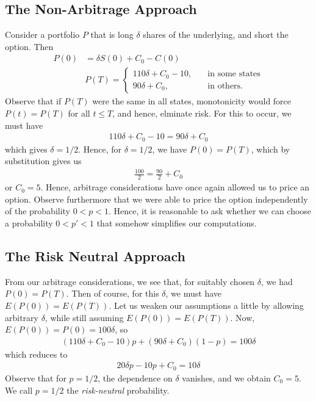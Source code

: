 \documentclass[12pt]{article}
\theoremstyle{plain}
\theoremstyle{definition}
\theoremstyle{remark}
\numberwithin{equation}{section}  %
\begin{document}
\subsection{The Non-Arbitrage Approach}
Consider a portfolio $P$
that is long $\delta$ shares of the underlying, and short the option.
Then
\begin{equation*}
	\begin{split}
		P(0) & = \delta S(0) + C_{0} - C(0)
		\\
		& P(T) = \begin{cases}
		110 \delta + C_{0} - 10, \quad & \text{in some states}
		\\
		90 \delta + C_{0}, \quad & \text{in others}.
	\end{cases}
\end{split}
	\end{equation*}
	Observe that if $P(T)$ were the same in all states, monotonicity would force
	$P(t) = P(T)$ for all $t \le T$, and hence, elminate risk. For this to occur,
	we must have
	\begin{equation*}
		\begin{split}
			110 \delta + C_{0} - 10 = 90 \delta + C_{0}
		\end{split}
	\end{equation*}
	which gives $\delta = 1/2$. Hence, for $\delta = 1/2$, we have
	$P(0) = P(T)$, which by substitution gives us
	\begin{equation*}
		\begin{split}
			\frac{100}{2} = \frac{90}{2} + C_{0}
		\end{split}
	\end{equation*}
	or $C_{0} = 5$. Hence, arbitrage considerations have once again
	allowed us to price an option. Observe furthermore that we were able
	to price the option independently of the probability $0 < p < 1$. 
	Hence, it is reasonable to ask whether we can choose a probability
	$0 < p' < 1$ that somehow simplifies our computations.
	\subsection{The Risk Neutral Approach}
	From our arbitrage considerations, we see that, for suitably chosen
	$\delta$, we had $P(0) = P(T)$. Then of course, for this $\delta$, we must
	have $E(P(0)) = E(P(T))$. Let us weaken our assumptions a little by allowing
	arbitrary $\delta$, while still assuming $E(P(0)) = E(P(T))$. 
	Now, $E(P(0)) = P(0) = 100 \delta$, so
	\begin{equation*}
		\begin{split}
			(110 \delta + C_{0} - 10) p + (90 \delta + C_{0}) (1- p) = 100 \delta
		\end{split}
	\end{equation*}
	which reduces to
	\begin{equation*}
		\begin{split}
			20 \delta p - 10p + C_{0} = 10 \delta
		\end{split}
	\end{equation*}
	Observe that for $p = 1/2$, the dependence on $\delta$ vanishes, and we obtain
	$C_{0} = 5$. We call $p = 1/2$ the \emph{risk-neutral} probability.
\end{document}
